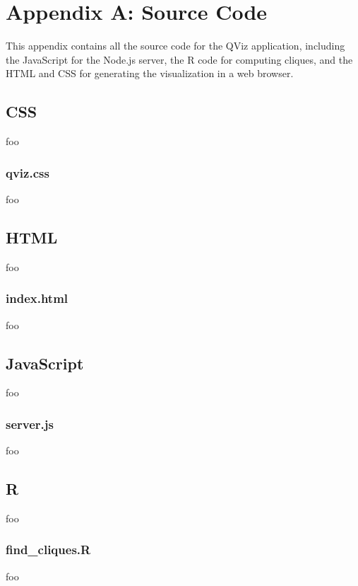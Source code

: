 \documentclass[12pt]{article}
\begin{document}







\section{Appendix A: Source Code}

This appendix contains all the source code for the QViz application, including the JavaScript for the Node.js server, the R code for computing cliques, and the HTML and CSS for generating the visualization in a web browser.

\subsection{CSS}
foo
\subsubsection{qviz.css}
foo

\subsection{HTML}
foo
\subsubsection{index.html}
foo

\subsection{JavaScript}
foo
\subsubsection{server.js}
foo

\subsection{R}
foo
\subsubsection{find\_cliques.R}
foo
\end{document}
